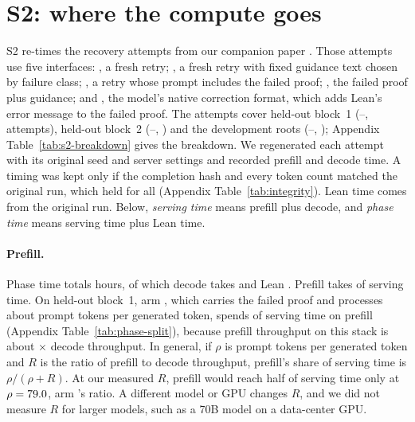 \section{S2: where the compute goes}
\label{sec:mechanism}

S2 re-times the recovery attempts from our companion paper \citep{reddy2026sticky}.  Those attempts use five interfaces: , a fresh retry; , a fresh retry with fixed guidance text chosen by failure class; , a retry whose prompt includes the failed proof; , the failed proof plus guidance; and , the model's native correction format, which adds Lean's error message to the failed proof.  The \AllBranches{} attempts cover held-out block~1 (--, \CrSTwoBlockOneBranches{} attempts), held-out block~2 (--, \CrSTwoBlockTwoBranches{}) and the development roots (--, \CrSTwoDevBranches{}); Appendix Table~\ref{tab:s2-breakdown} gives the breakdown.  We regenerated each attempt with its original seed and server settings and recorded prefill and decode time.  A timing was kept only if the completion hash and every token count matched the original run, which held for all \AllBranches{} (Appendix Table~\ref{tab:integrity}).  Lean time comes from the original run.  Below, \emph{serving time} means prefill plus decode, and \emph{phase time} means serving time plus Lean time.

\paragraph{Prefill.}
Phase time totals \PhaseHours{} hours, of which decode takes \DecodeTotalShare{} and Lean \VerifierTotalShare{}.  Prefill takes \PrefillServingShare{} of serving time.  On held-out block~1, arm , which carries the failed proof and processes about \WorkloadArmCRho{} prompt tokens per generated token, spends \PrefillArmCShare{} of serving time on prefill (Appendix Table~\ref{tab:phase-split}), because prefill throughput on this stack is about \StackArmCR{}$\times$ decode throughput.  In general, if $\rho$ is prompt tokens per generated token and $R$ is the ratio of prefill to decode throughput, prefill's share of serving time is $\rho/(\rho+R)$.  At our measured $R$, prefill would reach half of serving time only at $\rho=79.0{}$, \CrossoverFactorHalf{} arm 's ratio.  A different model or GPU changes $R$, and we did not measure $R$ for larger models, such as a 70B model on a data-center GPU.

